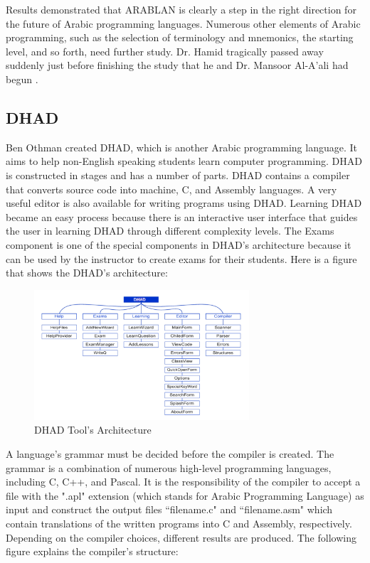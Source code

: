 Results demonstrated that ARABLAN is clearly a step in the right direction for the future of Arabic programming languages. Numerous other elements of Arabic programming, such as the selection of terminology and mnemonics, the starting level, and so forth, need further study. Dr. Hamid tragically passed away suddenly just before finishing the study that he and Dr. Mansoor Al-A'ali had begun \cite{al2007evaluation}.
\subsection{DHAD}
Ben Othman \cite{othman2016arabic} created DHAD, which is another Arabic programming language. It aims to help non-English speaking students learn computer programming. DHAD is constructed in stages and has a number of parts. DHAD contains a compiler that converts source code into machine, C, and Assembly languages. A very useful editor is also available for writing programs using DHAD. Learning DHAD became an easy process because there is an interactive user interface that guides the user in learning DHAD through different complexity levels. The Exams component is one of the special components in DHAD’s architecture because it can be used by the instructor to create exams for their students. Here is a figure that shows the DHAD's architecture:
\begin{figure}[H]
\centering
\includegraphics[width=8cm]{ch2-images/DHAD.png}
\caption{DHAD Tool’s Architecture \cite{othman2016arabic}}
\label{fig:DHAD Tool’s Architecture}
\end{figure}

A language's grammar must be decided before the compiler is created. The grammar is a combination of numerous high-level programming languages, including C, C++, and Pascal. It is the responsibility of the compiler to accept a file with the ".apl" extension (which stands for Arabic Programming Language) as input and construct the output files ``filename.c" and ``filename.asm" which contain translations of the written programs into C and Assembly, respectively. Depending on the compiler choices, different results are produced. The following figure explains the compiler's structure:

